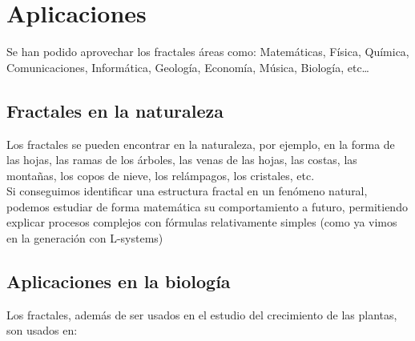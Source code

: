 \chapter{Aplicaciones}

\noindent Se han podido aprovechar los fractales áreas como: Matemáticas, Física, Química, Comunicaciones, Informática, Geología, Economía, Música, Biología, etc…\\

\section{Fractales en la naturaleza}

\noindent Los fractales se pueden encontrar en la naturaleza, por ejemplo, en la forma de las hojas, las ramas de los árboles, las venas de las hojas, las costas, las montañas, los copos de nieve, los relámpagos, los cristales, etc.\\

\noindent Si conseguimos identificar una estructura fractal en un fenómeno natural, podemos estudiar de forma matemática su comportamiento a futuro, permitiendo explicar procesos complejos con fórmulas relativamente simples (como ya vimos en la generación con L-systems)\\

\section{Aplicaciones en la biología}

\noindent Los fractales, además de ser usados en el estudio del crecimiento de las plantas, son usados en:

